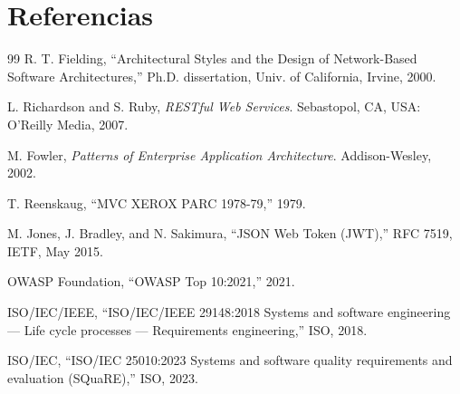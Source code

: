 \section*{Referencias}
\begin{thebibliography}{99}
\setlength{\itemsep}{4pt}
 R. T. Fielding, ``Architectural Styles and the Design of Network-Based Software
Architectures,'' Ph.D. dissertation, Univ. of California, Irvine, 2000.

 L. Richardson and S. Ruby, \textit{RESTful Web Services}. Sebastopol, CA, USA: O'Reilly
Media, 2007.

 M. Fowler, \textit{Patterns of Enterprise Application Architecture}. Addison-Wesley, 2002.

 T. Reenskaug, ``MVC XEROX PARC 1978-79,'' 1979.

 M. Jones, J. Bradley, and N. Sakimura, ``JSON Web Token (JWT),'' RFC 7519, IETF, May 2015.

 OWASP Foundation, ``OWASP Top 10:2021,'' 2021.

 ISO/IEC/IEEE, ``ISO/IEC/IEEE 29148:2018 Systems and software engineering --- Life cycle processes --- Requirements engineering,'' ISO, 2018.

 ISO/IEC, ``ISO/IEC 25010:2023 Systems and software quality requirements and evaluation (SQuaRE),'' ISO, 2023.
\end{thebibliography}
